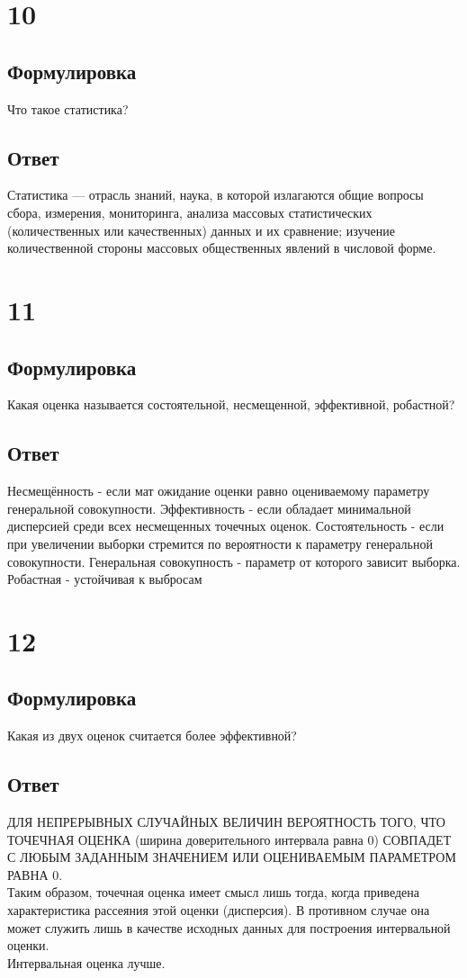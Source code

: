 \documentclass[a4]{article}
\begin{document}
	\section{10}
	\subsection*{Формулировка}
	Что такое статистика?
	\subsection*{Ответ}
	Статистика — отрасль знаний, наука, в которой излагаются общие вопросы сбора, измерения, мониторинга, анализа массовых статистических (количественных или качественных) данных и их сравнение; изучение количественной стороны массовых общественных явлений в числовой форме.
	
	\section{11}
	\subsection*{Формулировка}
	Какая оценка называется состоятельной, несмещенной, эффективной, робастной?
	\subsection*{Ответ}
	Несмещённость - если мат ожидание оценки равно оцениваемому параметру генеральной совокупности. Эффективность - если обладает минимальной дисперсией среди всех несмещенных точечных оценок. Состоятельность - если при увеличении выборки стремится по вероятности к параметру генеральной совокупности. Генеральная совокупность - параметр от которого зависит выборка. Робастная - устойчивая к выбросам\\
	
	\section{12}
	\subsection*{Формулировка}
	Какая из двух оценок считается более эффективной?
	\subsection*{Ответ}
	ДЛЯ НЕПРЕРЫВНЫХ СЛУЧАЙНЫХ ВЕЛИЧИН ВЕРОЯТНОСТЬ ТОГО, ЧТО ТОЧЕЧНАЯ ОЦЕНКА (ширина доверительного интервала равна 0) СОВПАДЕТ С ЛЮБЫМ ЗАДАННЫМ ЗНАЧЕНИЕМ ИЛИ ОЦЕНИВАЕМЫМ ПАРАМЕТРОМ РАВНА 0.\\
	Таким образом, точечная оценка имеет смысл лишь тогда, когда приведена характеристика рассеяния этой оценки (дисперсия). В противном случае она может служить лишь в качестве исходных данных для построения интервальной оценки.\\
	Интервальная оценка лучше.
	
\end{document}
